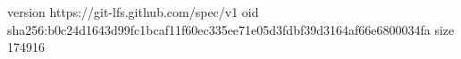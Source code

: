 version https://git-lfs.github.com/spec/v1
oid sha256:b0c24d1643d99fc1bcaf11f60ec335ee71e05d3fdbf39d3164af66e6800034fa
size 174916
